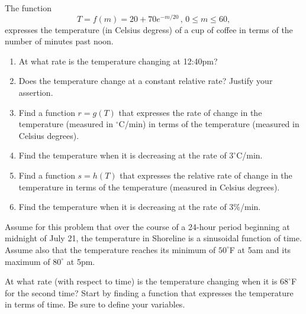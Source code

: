 \documentclass{ximera}
\begin{document}
\begin{question}  \label{Q33eerrggg}
The function
\[
   T = f(m) = 20+70e^{-m/20}\, , \, 0\leq m \leq 60 ,
\]
expresses the temperature (in Celsius degress) of a cup of coffee in terms of the number of minutes past noon.

\begin{enumerate}
\item At what rate is the temperature changing at 12:40pm?

\item Does the temperature change at a constant relative rate? Justify your assertion.

\item Find a function $r=g(T)$ that expresses the rate of change in the temperature (measured in $^\circ$C/min) in terms of the temperature (measured in Celsius degrees).

\item Find the temperature when it is decreasing at the rate of $3^\circ$C/min.

\item Find a function $s=h(T)$ that expresses the relative rate of change in the temperature in terms of the temperature (measured in Celsius degrees).

\item Find the temperature when it is decreasing at the rate of $3\%$/min.
\end{enumerate}
\end{question}


\begin{question} \label{Qggey5ghhtt}
Assume for this problem that over the course of a 24-hour period beginning at midnight of July 21, the temperature in Shoreline is a sinusoidal function of time. Assume also that the temperature reaches its minimum of $50^\circ$F at 5am and its maximum of $80^\circ$ at 5pm.

At what rate (with respect to time) is the temperature changing when it is $68^\circ$F for the second time? Start by finding a function that expresses the temperature in terms of time. Be sure to define your variables.
\end{question}
\end{document}
